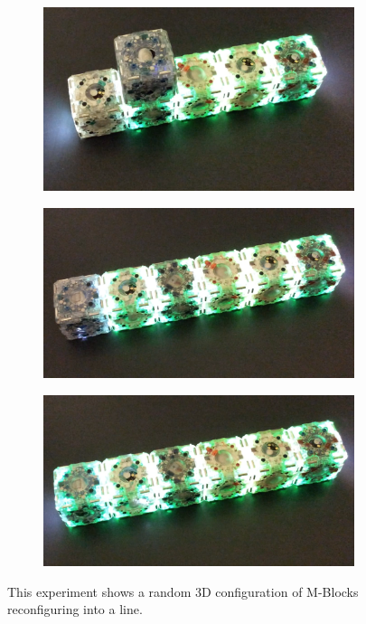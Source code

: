 \begin{figure}[h]
	\begin{subfigure}[b]{0.32\linewidth}
		\includegraphics[width=0.95\linewidth]{figures/ActualLine_4.png}
		\subcaption{} 
	\end{subfigure}
	\begin{subfigure}[b]{0.32\linewidth}
		\includegraphics[width=0.95\linewidth]{figures/ActualLine_5.png}
		\subcaption{} 
	\end{subfigure}
	\begin{subfigure}[b]{0.32\linewidth}
		\includegraphics[width=0.95\linewidth]{figures/ActualLine_6.png}
		\subcaption{} 
	\end{subfigure}
	
	\caption{This experiment shows a random 3D configuration of M-Blocks reconfiguring into a line.}
	
	\label{fig:lineExperiment}
\end{figure}

